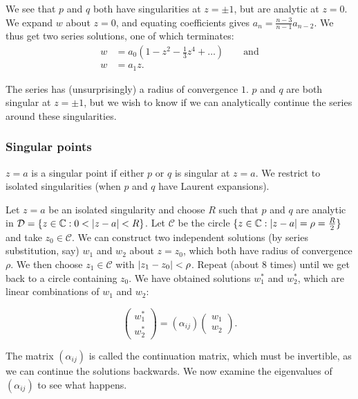 \documentclass{notes}
\newcommand{\D}{\mathcal{D}}
\newcommand{\cC}{\mathcal{C}}
\theoremstyle{plain}
\begin{document}
We see that $p$ and $q$ both have singularities at $z=\pm 1$, but are analytic
at $z=0$.  We expand $w$ about $z=0$, and equating coefficients gives
$a_n = \frac{n-3}{n-1} a_{n-2}$.  We thus get two series solutions, one of
which terminates:
\begin{align*}
w &= a_0 \left(1  - z^2 - \tfrac{1}{3}z^4 + \dots \right) \qquad \text{and}\\
w &= a_1 z.
\end{align*}

The series has (unsurprisingly) a radius of convergence $1$.  $p$ and $q$ are
both singular at $z=\pm 1$, but we wish to know if we can analytically
continue the series around these singularities.

\subsubsection*{Singular points}

$z=a$ is a singular point if either $p$ or $q$ is singular at $z=a$.  We
restrict to isolated singularities (when $p$ and $q$ have Laurent
expansions).

Let $z=a$ be an isolated singularity and choose $R$ such that $p$
and $q$ are analytic in $\D = \{z \in \C : 0 <\abs{z-a} < R \}$.
Let $\cC$ be the circle $\{ z \in \mathbb{C} : \left|z-a\right| = \rho = \tfrac{R}{2}\}$
and take $z_0 \in \cC$.  We can construct two independent solutions
(by series substitution, say) $w_1$ and $w_2$ about $z = z_0$, which
both have radius of convergence $\rho$.  We then choose $z_1 \in \cC$
with $\left|z_1 - z_0\right| < \rho$.  Repeat (about 8 times) until we get
back to a circle containing $z_0$.  We have obtained solutions
$w_1^\ast$ and $w_2^\ast$, which are linear combinations of $w_1$
and $w_2$:

\begin{equation}
\begin{pmatrix}
w_1^\ast \\ w_2^\ast
\end{pmatrix}
= \left( \alpha_{i j} \right)
\begin{pmatrix}
w_1 \\ w_2
\end{pmatrix}.
\end{equation}

The matrix $\left( \alpha_{i j} \right)$ is called the continuation matrix,
which must be invertible, as we can continue the solutions backwards.  We
now examine the eigenvalues of $\left( \alpha_{i j} \right)$ to see what
happens.
\end{document}
